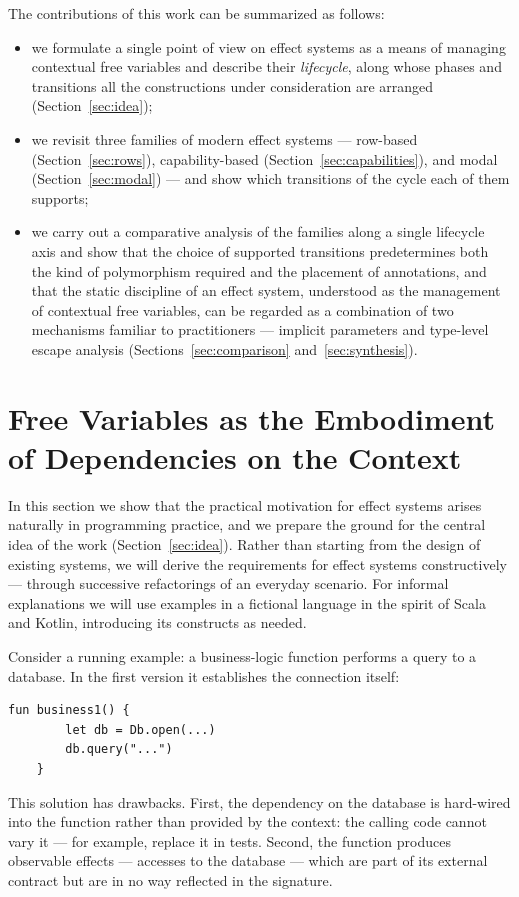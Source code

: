 \documentclass[11pt]{article}
\begin{document}
The contributions of this work can be summarized as follows:
\begin{itemize}
    \item we formulate a single point of view on effect systems as a means of managing
    contextual free variables and describe their \emph{lifecycle}, along whose phases
    and transitions all the constructions under consideration are arranged
    (Section~\ref{sec:idea});
    \item we revisit three families of modern effect systems --- row-based
    (Section~\ref{sec:rows}), capability-based (Section~\ref{sec:capabilities}), and
    modal (Section~\ref{sec:modal}) --- and show which transitions of the cycle each of
    them supports;
    \item we carry out a comparative analysis of the families along a single lifecycle
    axis and show that the choice of supported transitions predetermines both the kind
    of polymorphism required and the placement of annotations, and that the static
    discipline of an effect system, understood as the management of contextual free
    variables, can be regarded as a combination of two mechanisms familiar to
    practitioners --- implicit parameters and type-level escape analysis
    (Sections~\ref{sec:comparison} and~\ref{sec:synthesis}).
\end{itemize}


\section{Free Variables as the Embodiment of Dependencies on the Context}\label{sec:es-intro}

In this section we show that the practical motivation for effect systems arises naturally in
programming practice, and we prepare the ground for the central idea of the work
(Section~\ref{sec:idea}).
Rather than starting from the design of existing systems, we will derive the requirements
for effect systems constructively --- through successive refactorings of an everyday scenario.
For informal explanations we will use examples in a fictional language in the spirit of
Scala and Kotlin, introducing its constructs as needed.

Consider a running example: a business-logic function performs a query to a database. In
the first version it establishes the connection itself:
\begin{lstlisting}[language=colang]
    fun business1() {
        let db = Db.open(...)
        db.query("...")
    }
\end{lstlisting}
This solution has drawbacks. First, the dependency on the database is hard-wired into the
function rather than provided by the context: the calling code cannot vary it --- for
example, replace it in tests. Second, the function produces observable
effects --- accesses to the database --- which are part of its external contract but
are in no way reflected in the signature.
\end{document}
